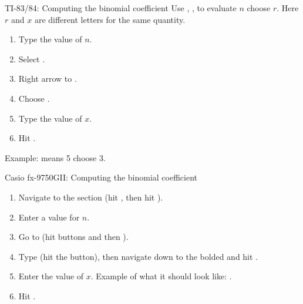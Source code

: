 \begin{onebox}{ TI-83/84: Computing the binomial coefficient \MakeLowercase{}}
Use , ,  to evaluate $n$ choose $r$. Here $r$ and $x$ are different letters for the same quantity.
\begin{enumerate}
\setlength{\itemsep}{0mm}
\item Type the value of $n$.
\item Select .
\item Right arrow to .
\item Choose .
\item Type the value of $x$.
\item Hit .
\end{enumerate}
Example:  means {5 choose 3}.\end{onebox}

\begin{onebox}{ Casio fx-9750GII: Computing the binomial coefficient \MakeLowercase{}}
\begin{enumerate}
\setlength{\itemsep}{0mm}
\item Navigate to the  section (hit , then hit ).
\item Enter a value for $n$.
\item Go to  (hit buttons  and then ).
\item Type  (hit the  button), then navigate down to the bolded  and hit .
\item Enter the value of $x$. Example of what it should look like: .
\item Hit .
\end{enumerate}
\end{onebox}

